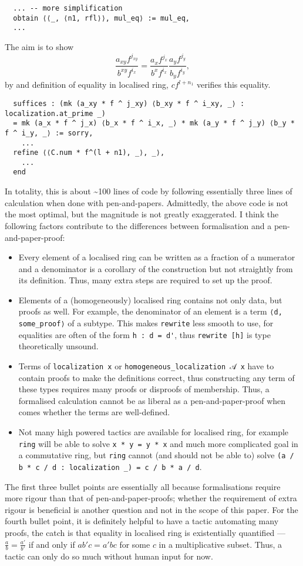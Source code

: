 \documentclass[a4paper,UKenglish,cleveref, autoref, thm-restate]{lipics-v2021}
\begin{document}
\begin{lstlisting}
  ... -- more simplification
  obtain ⟨⟨_, ⟨n1, rfl⟩⟩, mul_eq⟩ := mul_eq,
  ...
\end{lstlisting}
The aim is to show $$\frac{a_{xy}f^{j_{xy}}}{b^{xy}f^{i_x}}=\frac{a_x f^{j_x}}{b^x f^{i_x}} \frac{a_y f^{j_y}}{b_y f^{i_y}},$$
by  and definition of equality in localised ring, $c f^{l+n_1}$ verifies this equality.
\begin{lstlisting}
  suffices : (mk (a_xy * f ^ j_xy) ⟨b_xy * f ^ i_xy, _⟩ : localization.at_prime _) 
  = mk (a_x * f ^ j_x) ⟨b_x * f ^ i_x, _⟩ * mk (a_y * f ^ j_y) ⟨b_y * f ^ i_y, _⟩ := sorry,
    ...
  refine ⟨⟨C.num * f^(l + n1), _⟩, _⟩,
    ...
  end
\end{lstlisting}
In totality, this is about \textasciitilde100 lines of code by following essentially three lines of calculation when done with pen-and-papers. Admittedly, the above code is not the most optimal, but the magnitude is not greatly exaggerated. I think the following factors contribute to the differences between formalisation and a pen-and-paper-proof:
\begin{itemize}
    \item Every element of a localised ring can be written as a fraction of a numerator and a denominator is a corollary of the construction but not straightly from its definition. Thus, many extra steps are required to set up the proof.
    \item Elements of a (homogeneously) localised ring contains not only data, but proofs as well. For example, the denominator of an element is a term \lstinline{⟨d, some_proof⟩} of a subtype. This makes \lstinline{rewrite} less smooth to use, for equalities are often of the form \lstinline{h : d = d'}, thus \lstinline{rewrite [h]} is type theoretically unsound.
    \item Terms of \lstinline{localization x} or \lstinline{homogeneous_localization 𝒜 x} have to contain proofs to make the definitions correct, thus constructing any term of these types requires many proofs or disproofs of membership. Thus, a formalised calculation cannot be as liberal as a pen-and-paper-proof when comes whether the terms are well-defined.
    \item Not many high powered tactics are available for localised ring, for example \lstinline{ring} will be able to solve \lstinline{x * y = y * x} and much more complicated goal in a commutative ring, but \lstinline{ring} cannot (and should not be able to) solve \lstinline{(a / b * c / d : localization _) = c / b * a / d}.
\end{itemize}
The first three bullet points are essentially all because formalisations require more rigour than that of pen-and-paper-proofs; whether the requirement of extra rigour is beneficial is another question and not in the scope of this paper. For the fourth bullet point, it is definitely helpful to have a tactic automating many proofs, the catch is that equality in localised ring is existentially quantified --- $\frac a b = \frac {a'}{b'}$ if and only if $ab' c = a' b c$ for some $c$ in a multiplicative subset. Thus, a tactic can only do so much without human input for now.
\end{document}
